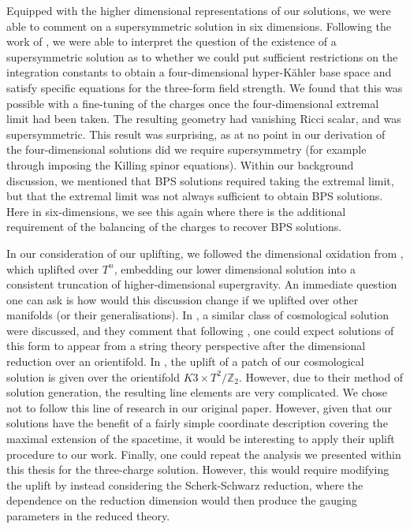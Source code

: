 Equipped with the higher dimensional representations of our solutions, we were able to comment on a supersymmetric solution in six dimensions. Following the work of \cite{Gutowski:2003rg, Cariglia:2004kk}, we were able to interpret the question of the existence of a supersymmetric solution as to whether we could put sufficient restrictions on the integration constants to obtain a four-dimensional hyper-K\"ahler base space and satisfy specific equations for the three-form field strength. We found that this was possible with a fine-tuning of the charges once the four-dimensional extremal limit had been taken. The resulting geometry had vanishing Ricci scalar, and was supersymmetric. This result was surprising, as at no point in our derivation of the four-dimensional solutions did we require supersymmetry (for example through imposing the Killing spinor equations). Within our background discussion, we mentioned that BPS solutions required taking the extremal limit, but that the extremal limit was not always sufficient to obtain BPS solutions. Here in six-dimensions, we see this again where there is the additional requirement of the balancing of the charges to recover BPS solutions. 

In our consideration of our uplifting, we followed the dimensional oxidation from \cite{Chow:2014cca}, which uplifted over $T^n$, embedding our lower dimensional solution into a consistent truncation of higher-dimensional supergravity. An immediate question one can ask is how would this discussion change if we uplifted over other manifolds (or their generalisations). In \cite{Burgess:2002vu}, a similar class of cosmological solution were discussed, and they comment that following \cite{Cornalba:2003kd}, one could expect solutions of this form to appear from a string theory perspective after the dimensional reduction over an orientifold. In \cite{Fre:2008zd}, the uplift of a patch of our cosmological solution is given over the orientifold $K3 \times T^2 / \mathbb{Z}_2$. However, due to their method of solution generation, the resulting line elements are very complicated. We chose not to follow this line of research in our original paper. However, given that our solutions have the benefit of a fairly simple coordinate description covering the maximal extension of the spacetime, it would be interesting to apply their uplift procedure to our work. Finally, one could repeat the analysis we presented within this thesis for the three-charge solution. However, this would require modifying the uplift by instead considering the Scherk-Schwarz reduction, where the dependence on the reduction dimension would then produce the gauging parameters in the reduced theory.

